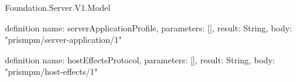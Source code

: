 \begin{lexlean}{Foundation.Server.V1.Model}
\begin{semanticmodule}
definition{
  name: serverApplicationProfile,
  parameters: [],
  result: String,
  body: "prismpm/server-application/1"
}

definition{
  name: hostEffectsProtocol,
  parameters: [],
  result: String,
  body: "prismpm/host-effects/1"
}
\end{semanticmodule}
\end{lexlean}
